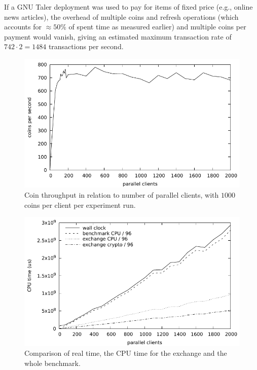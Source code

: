 If a GNU Taler deployment was used to pay for items of fixed price (e.g., online
news articles), the overhead of multiple coins and refresh operations (which
accounts for $\approx 50\%$ of spent time as measured earlier) and multiple
coins per payment would vanish, giving an estimated maximum transaction rate of
$742 \cdot 2 = 1484$ transactions per second.

\begin{figure}
  \includegraphics[width=\textwidth]{plots/speed.pdf}
  \caption[Coin throughput.]{Coin throughput in relation to number of parallel clients, with $1000$ coins per client per experiment run.}
  \label{fig:benchmark-throughput}
\end{figure}

\begin{figure}
  \includegraphics[width=\textwidth]{plots/cpu.pdf}
  \caption[Comparison of components' CPU usage for the benchmark.]{Comparison of real time, the CPU time for the exchange and the whole benchmark.}
  \label{fig:benchmark-cpu}
\end{figure}

